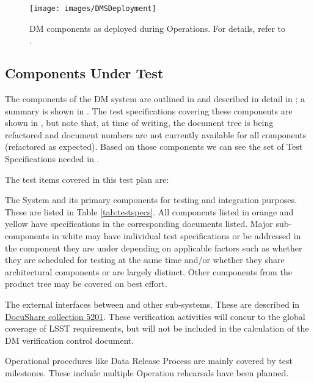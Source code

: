 \begin{figure}[htbp]
	\begin{center}
		\texttt{[image: images/DMSDeployment]}
		\caption{DM components as deployed during Operations. For details, refer to .
		\label{fig:dmsdeploy}}
	\end{center}
\end{figure}

\subsection{Components Under Test}\label{sect:components}

The components of the DM system are outlined in  and described in detail in ; a summary is shown in .
The test specifications covering these components are shown in , but note that, at time of writing, the document tree is being refactored and document numbers are not currently available for all components (refactored as expected).
Based on those components we can see the set of Test Specifications needed in .

The test items covered in this test plan are:

\begin{itemize_single}

\item The \product{} System and its primary components for testing and integration purposes. These are listed in Table \ref{tab:testspecs}.
All components listed in orange and yellow have specifications in the corresponding documents listed.
Major sub-components in white may have individual test specifications or be addressed in the component they are under depending on applicable factors such as whether they are scheduled for testing at the same time and/or whether they share architectural components or are largely distinct.
Other components from the product tree may be covered on best effort.

\item The external interfaces between \product{} and other sub-systems. These are described in \href{https://ls.st/Collection-5201}{DocuShare collection 5201}. These verification activities will concur to the global coverage of LSST requirements, but will not be included in the calculation of the DM verification control document.


\item Operational procedures like Data Release Process  are mainly covered by test milestones. These include  multiple Operation rehearsals have been planned.

\end{itemize_single}

